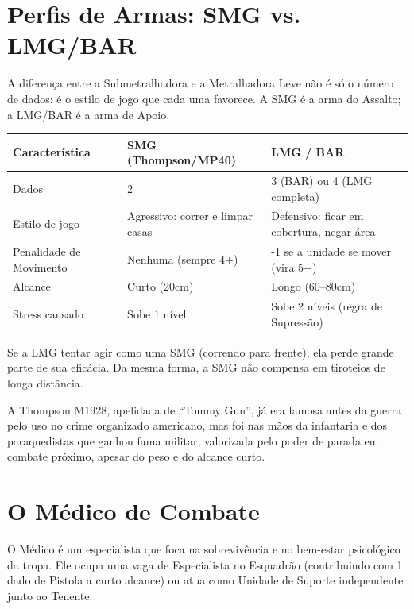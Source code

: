 \section{Perfis de Armas: SMG vs. LMG/BAR}

A diferença entre a Submetralhadora e a Metralhadora Leve não é só o número de dados: é o estilo de jogo que cada uma favorece. A SMG é a arma do Assalto; a LMG/BAR é a arma de Apoio.

\begin{center}
\begin{tabular}{p{3.6cm}p{4.4cm}p{4.4cm}}
\toprule
Característica & SMG (Thompson/MP40) & LMG / BAR \\
\midrule
Dados & 2 & 3 (BAR) ou 4 (LMG completa) \\
Estilo de jogo & Agressivo: correr e limpar casas & Defensivo: ficar em cobertura, negar área \\
Penalidade de Movimento & Nenhuma (sempre 4+) & -1 se a unidade se mover (vira 5+) \\
Alcance & Curto (20cm) & Longo (60--80cm) \\
Stress causado & Sobe 1 nível & Sobe 2 níveis (regra de Supressão) \\
\bottomrule
\end{tabular}
\end{center}

\begin{nota}
Se a LMG tentar agir como uma SMG (correndo para frente), ela perde grande parte de sua eficácia. Da mesma forma, a SMG não compensa em tiroteios de longa distância.
\end{nota}

\begin{nota}
A Thompson M1928, apelidada de ``Tommy Gun'', já era famosa antes da guerra pelo uso no crime organizado americano, mas foi nas mãos da infantaria e dos paraquedistas que ganhou fama militar, valorizada pelo poder de parada em combate próximo, apesar do peso e do alcance curto.
\end{nota}

\section{O Médico de Combate}

O Médico é um especialista que foca na sobrevivência e no bem-estar psicológico da tropa. Ele ocupa uma vaga de Especialista no Esquadrão (contribuindo com 1 dado de Pistola a curto alcance) ou atua como Unidade de Suporte independente junto ao Tenente.

